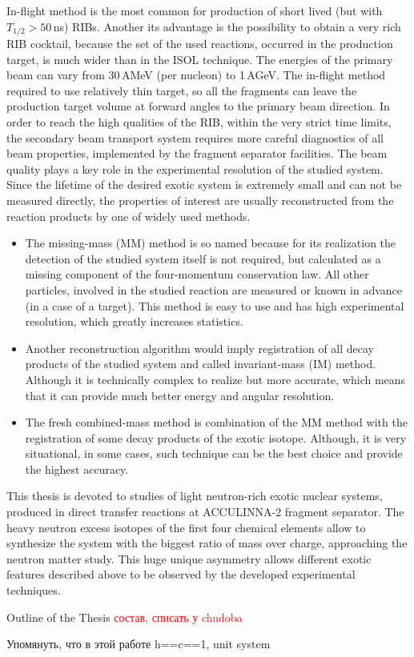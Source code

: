 In-flight method is the most common for production of short lived (but with $T_{1/2}>50\,$ns) RIBs. 
Another its advantage is the possibility to obtain a very rich RIB cocktail, because the set of the used reactions, occurred in the production target, is much wider than in the ISOL technique. 
The energies of the primary beam can vary from 30\,AMeV (per nucleon) to 1\,AGeV.
The in-flight method required to use relatively thin target, so all the fragments can leave the production target volume at forward angles to the primary beam direction. 
In order to reach the high qualities of the RIB, within the very strict time limits, the secondary beam transport system requires more careful diagnostics of all beam properties, implemented by the fragment separator facilities.
The beam quality plays a key role in the experimental resolution of the studied system.
Since the lifetime of the desired exotic system is extremely small and can not be measured directly, the properties of interest are usually reconstructed from the reaction products by one of widely used methods.
\begin{itemize}
	\item 
	The missing-mass (MM) method is so named because for its realization the detection of the studied system itself is not required, but calculated as a missing component of the four-momentum conservation law.
	All other particles, involved in the studied reaction are measured or known in advance (in a case of a target). 
	This method is easy to use and has high experimental resolution, which greatly increases statistics.

	\item 
	Another reconstruction algorithm would imply registration of all decay products of the studied system and called invariant-mass (IM) method.
	Although it is technically complex to realize but more accurate, which means that it can provide much better energy and angular resolution.
	
	\item 
	The fresh combined-mass method is combination of the MM method with the registration of some decay products of the exotic isotope.
	Although, it is very situational, in some cases, such technique can be the best choice and provide the highest accuracy. 
	 
	 
\end{itemize}	


This thesis is devoted to studies of light neutron-rich exotic nuclear systems, produced in direct transfer reactions at ACCULINNA-2 fragment separator.
The heavy neutron excess isotopes of the first four chemical elements allow to synthesize the system with the biggest ratio of mass over charge, approaching the neutron matter study.
This huge unique asymmetry allows different exotic features described above to be observed by the developed experimental techniques.

Outline of the Thesis
\textcolor{red}{состав, списать у chudoba}

Упомянуть, что в этой работе h==c==1, unit system










